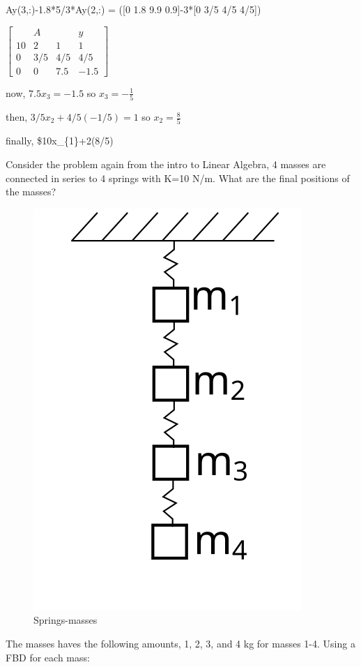\documentclass[11pt]{article}
\makeatletter
\def\maxwidth{\ifdim\Gin@nat@width>\linewidth\linewidth
    \else\Gin@nat@width\fi}
\let\Oldincludegraphics\includegraphics
\renewcommand{\includegraphics}[1]{\Oldincludegraphics[width=.8\maxwidth]{#1}}
\makeatother
\begin{document}
Ay(3,:)-1.8*5/3*Ay(2,:) = ({[}0 1.8 9.9 0.9{]}-3*{[}0 3/5 4/5 4/5{]})

$\left[
\begin{array}{ccc|c}
   & A & & y \\
10 & 2 & 1 & 1\\
0 & 3/5 & 4/5  & 4/5 \\
0 & 0 & 7.5 & -1.5\end{array}
\right] $

now, \(7.5x_{3}=-1.5\) so \(x_{3}=-\frac{1}{5}\)

then, \(3/5x_{2}+4/5(-1/5)=1\) so \(x_{2}=\frac{8}{5}\)

finally, \$10x\_\{1\}+2(8/5)

    Consider the problem again from the intro to Linear Algebra, 4 masses
are connected in series to 4 springs with K=10 N/m. What are the final
positions of the masses?

\begin{figure}[htbp]
\centering
\includegraphics{../lecture_09/mass_springs.svg}
\caption{Springs-masses}
\end{figure}

The masses haves the following amounts, 1, 2, 3, and 4 kg for masses
1-4. Using a FBD for each mass:
\end{document}
